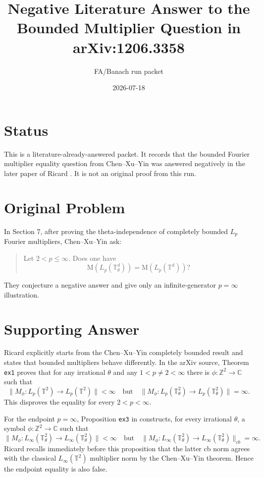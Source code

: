 \documentclass[11pt]{article}
\title{Negative Literature Answer to the Bounded Multiplier Question in arXiv:1206.3358}
\author{FA/Banach run packet}
\date{2026-07-18}
\begin{document}
\maketitle

\section*{Status}

This is a literature-already-answered packet. It records that the bounded
Fourier multiplier equality question from Chen--Xu--Yin \cite{CXY} was answered
negatively in the later paper of Ricard \cite{Ricard}. It is not an original
proof from this run.

\section*{Original Problem}

In Section 7, after proving the theta-independence of completely bounded
\(L_p\) Fourier multipliers, Chen--Xu--Yin ask:

\begin{quote}
Let \(2<p\leq\infty\). Does one have
\[
\mathrm{M}(L_p(\mathbb T^d_\theta))=\mathrm{M}(L_p(\mathbb T^d))?
\]
\end{quote}

They conjecture a negative answer and give only an infinite-generator
\(p=\infty\) illustration.

\section*{Supporting Answer}

Ricard \cite{Ricard} explicitly starts from the Chen--Xu--Yin completely
bounded result and states that bounded multipliers behave differently. In the
arXiv source, Theorem \texttt{ex1} proves that for any irrational
\(\theta\) and any \(1<p\neq 2<\infty\) there is
\(\phi:\mathbb Z^2\to\mathbb C\) such that
\[
\|M_\phi:L_p(\mathbb T^2)\to L_p(\mathbb T^2)\|<\infty
\quad\text{but}\quad
\|M_\phi:L_p(\mathbb T^2_\theta)\to L_p(\mathbb T^2_\theta)\|=\infty.
\]
This disproves the equality for every \(2<p<\infty\).

For the endpoint \(p=\infty\), Proposition \texttt{ex3} in \cite{Ricard}
constructs, for every irrational \(\theta\), a symbol \(\phi:\mathbb Z^2\to
\mathbb C\) such that
\[
\|M_\phi:L_\infty(\mathbb T^2_\theta)\to L_\infty(\mathbb T^2_\theta)\|<\infty
\quad\text{but}\quad
\|M_\phi:L_\infty(\mathbb T^2_\theta)\to L_\infty(\mathbb T^2_\theta)\|_{cb}
=\infty.
\]
Ricard recalls immediately before this proposition that the latter cb norm
agrees with the classical \(L_\infty(\mathbb T^2)\) multiplier norm by the
Chen--Xu--Yin theorem. Hence the endpoint equality is also false.
\end{document}
